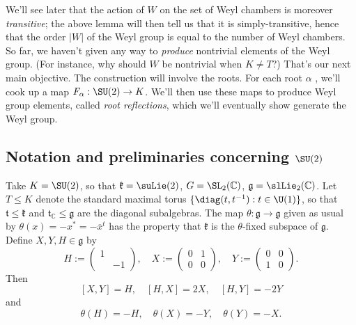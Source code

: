 \documentclass[reqno]{amsart} 
\begin{document}
We'll see later that the action of $W$ on the set of Weyl chambers is moreover \emph{transitive}; the above lemma will then tell us that it is simply-transitive, hence that the order $|W|$ of the Weyl group is equal to the number of Weyl chambers.  So far, we haven't given any way to \emph{produce} nontrivial elements of the Weyl group.  (For instance, why should $W$ be nontrivial when $K \neq T$?)  That's our next main objective.  The construction will involve the roots.  For each root $\alpha$ , we'll cook up a map $F_\alpha : \SU(2) \rightarrow K$.  We'll then use these maps to produce Weyl group elements, called \emph{root reflections}, which we'll eventually show generate the Weyl group.

\subsection{Notation and preliminaries concerning \texorpdfstring{$\SU(2)$}{SU(2)}}\label{sec:cnh2vouvuy}
Take $K = \SU(2)$, so that $\mathfrak{k} = \suLie(2)$, $G = \SL_2(\mathbb{C})$, $\mathfrak{g} = \slLie_2(\mathbb{C})$.  Let $T \leq K$ denote the standard maximal torus $\{\diag(t,t^{-1}) : t \in \U(1)\}$, so that $\mathfrak{t} \leq \mathfrak{k}$ and $\mathfrak{t}_{\mathbb{C}} \leq \mathfrak{g}$ are the diagonal subalgebras.  The map $\theta : \mathfrak{g} \rightarrow \mathfrak{g}$ given as usual by $\theta(x) = - x^* = - \overline{x}^t$ has the property that $\mathfrak{k}$ is the $\theta$-fixed subspace of $\mathfrak{g}$.  Define $X,Y,H \in \mathfrak{g}$ by
\begin{equation}\label{eq:defn-HXY}
  H := 
\begin{pmatrix}
    1 &  \\
    & -1
  \end{pmatrix}
, \quad X := 
\begin{pmatrix}
    0 & 1 \\
    0 & 0
  \end{pmatrix}
, \quad Y := 
\begin{pmatrix}
    0 & 0 \\
    1 & 0
  \end{pmatrix}
.
\end{equation}
Then
\begin{equation}\label{eq:relations-X-Y-H}
  [X,Y] = H,
  \quad
  [H, X] = 2 X,
  \quad
  [H, Y] = - 2 Y
\end{equation}
and
\begin{equation}\label{eq:relations-X-Y-H-theta}
  \theta(H) = - H,
  \quad
  \theta(X) = -Y,
  \quad
  \theta(Y) = -X.
\end{equation}
\end{document}
